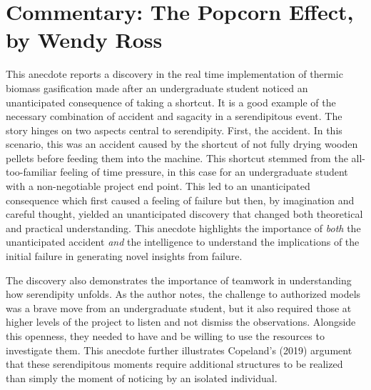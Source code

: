 \documentclass[authordate, commentary]{jote-new-article}
\author[1]{\mbox{Wendy Ross\orcid{0000-0002-0461-7660}}}
\affil[1]{London Metropolitan, London, the United Kingdom}
\begin{document}
\begin{frontmatter}
  \maketitle
  \begin{abstract}
    \printabstracttext
  \end{abstract}
\end{frontmatter}


	\section{Commentary: The Popcorn Effect, by Wendy Ross}


	This anecdote reports a discovery in the real time implementation of thermic biomass gasification made after an undergraduate student noticed an unanticipated consequence of taking a shortcut. It is a good example of the necessary combination of accident and sagacity in a serendipitous event. The story hinges on two aspects central to serendipity. First, the accident. In this scenario, this was an accident caused by the shortcut of not fully drying wooden pellets before feeding them into the machine. This shortcut stemmed from the all-too-familiar feeling of time pressure, in this case for an undergraduate student with a non-negotiable project end point. This led to an unanticipated consequence which first caused a feeling of failure but then, by imagination and careful thought, yielded an unanticipated discovery that changed both theoretical and practical understanding. This anecdote highlights the importance of \emph{both} the unanticipated accident \emph{and} the intelligence to understand the implications of the initial failure in generating novel insights from failure.



	The discovery also demonstrates the importance of teamwork in understanding how serendipity unfolds. As the author notes, the challenge to authorized models was a brave move from an undergraduate student, but it also required those at higher levels of the project to listen and not dismiss the observations. Alongside this openness, they needed to have and be willing to use the resources to investigate them. This anecdote further illustrates Copeland's (2019) argument that these serendipitous moments require additional structures to be realized than simply the moment of noticing by an isolated individual.

\end{document}
